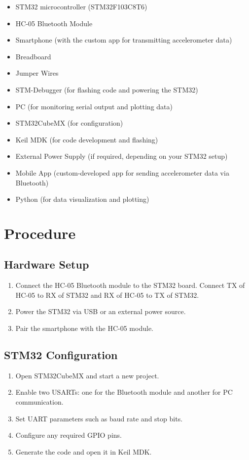 \documentclass[A4paper,12pt]{extreport}
\begin{document}
\begin{itemize}
    \item STM32 microcontroller (STM32F103C8T6)
    \item HC-05 Bluetooth Module
    \item Smartphone (with the custom app for transmitting accelerometer data)
    \item Breadboard
    \item Jumper Wires
    \item STM-Debugger (for flashing code and powering the STM32)
    \item PC (for monitoring serial output and plotting data)
    \item STM32CubeMX (for configuration)
    \item Keil MDK (for code development and flashing)
    \item External Power Supply (if required, depending on your STM32 setup)
    \item Mobile App (custom-developed app for sending accelerometer data via Bluetooth)
    \item Python (for data visualization and plotting)
\end{itemize}
\section{Procedure}

\subsection{Hardware Setup}
\begin{enumerate}
    \item Connect the HC-05 Bluetooth module to the STM32 board. Connect TX of HC-05 to RX of STM32 and RX of HC-05 to TX of STM32.
    \item Power the STM32 via USB or an external power source.
    \item Pair the smartphone with the HC-05 module.
\end{enumerate}

\subsection{STM32 Configuration}
\begin{enumerate}
    \item Open STM32CubeMX and start a new project.
    \item Enable two USARTs: one for the Bluetooth module and another for PC communication.
    \item Set UART parameters such as baud rate and stop bits.
    \item Configure any required GPIO pins.
    \item Generate the code and open it in Keil MDK.
\end{enumerate}
\end{document}
